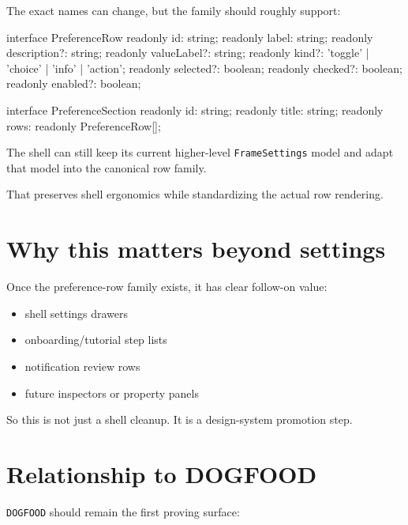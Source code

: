 The exact names can change, but the family should roughly support:

\begin{CodeBlock}
interface PreferenceRow {
  readonly id: string;
  readonly label: string;
  readonly description?: string;
  readonly valueLabel?: string;
  readonly kind?: 'toggle' | 'choice' | 'info' | 'action';
  readonly selected?: boolean;
  readonly checked?: boolean;
  readonly enabled?: boolean;
}

interface PreferenceSection {
  readonly id: string;
  readonly title: string;
  readonly rows: readonly PreferenceRow[];
}
\end{CodeBlock}

The shell can still keep its current higher-level \texttt{F\allowbreak{}r\allowbreak{}a\allowbreak{}m\allowbreak{}e\allowbreak{}S\allowbreak{}e\allowbreak{}t\allowbreak{}t\allowbreak{}i\allowbreak{}n\allowbreak{}g\allowbreak{}s} model and adapt that model into the canonical row family.

That preserves shell ergonomics while standardizing the actual row rendering.

\section{Why this matters beyond settings}\label{record-054-why-this-matters-beyond-settings}

Once the preference-row family exists, it has clear follow-on value:

\begin{itemize}
\tightlist
\item
  shell settings drawers
\item
  onboarding/tutorial step lists
\item
  notification review rows
\item
  future inspectors or property panels
\end{itemize}

So this is not just a shell cleanup. It is a design-system promotion step.

\section{Relationship to DOGFOOD}\label{record-054-relationship-to-dogfood}

\texttt{D\allowbreak{}O\allowbreak{}G\allowbreak{}F\allowbreak{}O\allowbreak{}O\allowbreak{}D} should remain the first proving surface:

